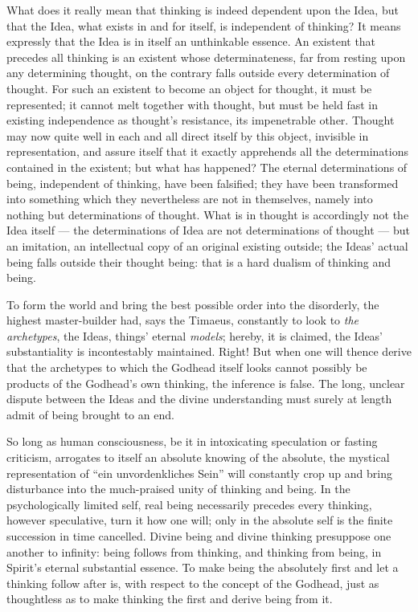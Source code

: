 \documentclass[12pt,a4paper]{book}
\begin{document}
What does it really mean that thinking is indeed dependent upon the Idea, but that the Idea, what exists in and for
itself, is independent of thinking? It means expressly that the Idea is in itself an unthinkable essence. An
existent that precedes all thinking is an existent whose determinateness, far from resting upon any determining
thought, on the contrary falls outside every determination of thought. For such an existent to become an object
for thought, it must be represented; it cannot melt together with thought, but must be held fast in existing
independence as thought's resistance, its impenetrable other. Thought may now quite well in each and all direct
itself by this object, invisible in representation, and assure itself that it exactly apprehends all
the determinations contained in the existent; but what has happened? The eternal determinations of being,
independent of thinking, have been falsified; they have been transformed into something which they nevertheless
are not in themselves, namely into nothing but determinations of thought. What is in thought is accordingly not the
Idea itself --- the determinations of Idea are not determinations of thought --- but an imitation, an intellectual
copy of an original existing outside; the Ideas' actual being falls outside their thought being: that is a hard
dualism of thinking and being.

To form the world and bring the best possible order into the disorderly, the highest master-builder had, says the
Timaeus, constantly to look to \emph{the archetypes}, the Ideas, things' eternal \emph{models}; hereby, it is
claimed, the Ideas' substantiality is incontestably maintained. Right! But when one will thence derive that the
archetypes to which the Godhead itself looks cannot possibly be products of the Godhead's own thinking, the
inference is false. The long, unclear dispute between the Ideas and the divine understanding must surely at length
admit of being brought to an end.

So long as human consciousness, be it in intoxicating speculation or fasting criticism, arrogates to itself an
absolute knowing of the absolute, the mystical representation of ``ein unvordenkliches Sein'' will constantly crop
up and bring disturbance into the much-praised unity of thinking and being. In the psychologically limited self,
real being necessarily precedes every thinking, however speculative, turn it how one will; only in the absolute self
is the finite succession in time cancelled. Divine being and divine thinking presuppose one another to infinity:
being follows from thinking, and thinking from being, in Spirit's eternal substantial essence. To make being the
absolutely first and let a thinking follow after is, with respect to the concept of the Godhead, just as thoughtless
as to make thinking the first and derive being from it.
\end{document}
